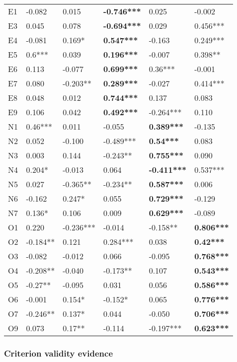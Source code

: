 \documentclass[man]{apa6}
\theoremstyle{definition}
\theoremstyle{definition}
\theoremstyle{definition}
\theoremstyle{remark}
\begin{document}
\begin{table}[ht]
\begin{tabular}{llllll}
  E1 & -0.082 & 0.015 & \textbf{-0.746***} & 0.025 & -0.002 \\ 
  E3 & 0.045 & 0.078 & \textbf{-0.694***} & 0.029 & 0.456*** \\ 
  E4 & -0.081 & 0.169* & \textbf{0.547***} & -0.163 & 0.249*** \\ 
  E5 & 0.6*** & 0.039 & \textbf{0.196***} & -0.007 & 0.398** \\ 
  E6 & 0.113 & -0.077 & \textbf{0.699***} & 0.36*** & -0.001 \\ 
  E7 & 0.080 & -0.203** & \textbf{0.289***} & -0.027 & 0.414*** \\ 
  E8 & 0.048 & 0.012 & \textbf{0.744***} & 0.137 & 0.083 \\ 
  E9 & 0.106 & 0.042 & \textbf{0.492***} & -0.264*** & 0.110 \\ 
  N1 & 0.46*** & 0.011 & -0.055 & \textbf{0.389***} & -0.135 \\ 
  N2 & 0.052 & -0.100 & -0.489*** & \textbf{0.54***} & 0.083 \\ 
  N3 & 0.003 & 0.144 & -0.243** & \textbf{0.755***} & 0.090 \\ 
  N4 & 0.204* & -0.013 & 0.064 & \textbf{-0.411***} & 0.537*** \\ 
  N5 & 0.027 & -0.365** & -0.234** & \textbf{0.587***} & 0.006 \\ 
  N6 & -0.162 & 0.247* & 0.055 & \textbf{0.729***} & -0.129 \\ 
  N7 & 0.136* & 0.106 & 0.009 & \textbf{0.629***} & -0.089 \\ 
  O1 & 0.220 & -0.236*** & -0.014 & -0.158** & \textbf{0.806***} \\ 
  O2 & -0.184** & 0.121 & 0.284*** & 0.038 & \textbf{0.42***} \\ 
  O3 & -0.082 & -0.012 & 0.066 & -0.095 & \textbf{0.768***} \\ 
  O4 & -0.208** & -0.040 & -0.173** & 0.107 & \textbf{0.543***} \\ 
  O5 & -0.27** & -0.095 & 0.031 & 0.056 & \textbf{0.586***} \\ 
  O6 & -0.001 & 0.154* & -0.152* & 0.065 & \textbf{0.776***} \\ 
  O7 & -0.246** & 0.137* & 0.044 & -0.050 & \textbf{0.706***} \\ 
  O9 & 0.073 & 0.17** & -0.114 & -0.197*** & \textbf{0.623***} \\ 
   \hline
\end{tabular}
\endgroup
\end{table}

\hypertarget{criterion-validity-evidence-1}{%
\subsubsection{Criterion validity
evidence}\label{criterion-validity-evidence-1}}
\end{document}

